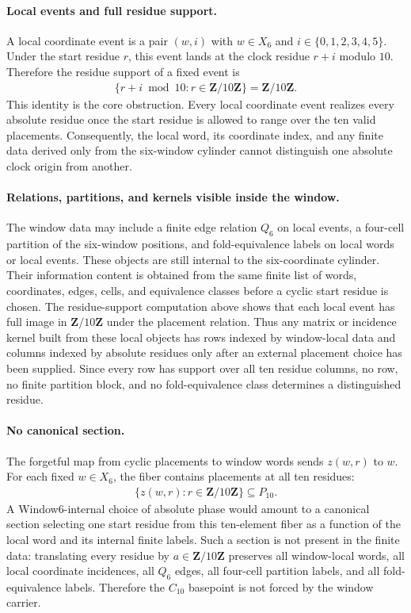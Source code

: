 \paragraph{Local events and full residue support.}
A local coordinate event is a pair $(w,i)$ with $w\in X_6$ and $i\in\{0,1,2,3,4,5\}$. Under the start residue $r$, this event lands at the clock residue $r+i$ modulo $10$. Therefore the residue support of a fixed event is
$$
\begin{aligned}
\{r+i\bmod 10:r\in \mathbf{Z}/10\mathbf{Z}\}=\mathbf{Z}/10\mathbf{Z}.
\end{aligned}
$$
This identity is the core obstruction. Every local coordinate event realizes every absolute residue once the start residue is allowed to range over the ten valid placements. Consequently, the local word, its coordinate index, and any finite data derived only from the six-window cylinder cannot distinguish one absolute clock origin from another.

\paragraph{Relations, partitions, and kernels visible inside the window.}
The window data may include a finite edge relation $Q_6$ on local events, a four-cell partition of the six-window positions, and fold-equivalence labels on local words or local events. These objects are still internal to the six-coordinate cylinder. Their information content is obtained from the same finite list of words, coordinates, edges, cells, and equivalence classes before a cyclic start residue is chosen. The residue-support computation above shows that each local event has full image in $\mathbf{Z}/10\mathbf{Z}$ under the placement relation. Thus any matrix or incidence kernel built from these local objects has rows indexed by window-local data and columns indexed by absolute residues only after an external placement choice has been supplied. Since every row has support over all ten residue columns, no row, no finite partition block, and no fold-equivalence class determines a distinguished residue.

\paragraph{No canonical section.}
The forgetful map from cyclic placements to window words sends $z(w,r)$ to $w$. For each fixed $w\in X_6$, the fiber contains placements at all ten residues:
$$
\begin{aligned}
\{z(w,r):r\in \mathbf{Z}/10\mathbf{Z}\}\subseteq P_{10}.
\end{aligned}
$$
A Window6-internal choice of absolute phase would amount to a canonical section selecting one start residue from this ten-element fiber as a function of the local word and its internal finite labels. Such a section is not present in the finite data: translating every residue by $a\in \mathbf{Z}/10\mathbf{Z}$ preserves all window-local words, all local coordinate incidences, all $Q_6$ edges, all four-cell partition labels, and all fold-equivalence labels. Therefore the $C_{10}$ basepoint is not forced by the window carrier.

